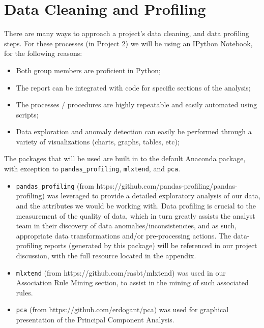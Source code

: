\documentclass[11pt]{article}
\providecommand{\tightlist}{%
      \setlength{\itemsep}{0pt}\setlength{\parskip}{0pt}}
\begin{document}
    \hypertarget{data-cleaning-and-profiling}{%
\section{Data Cleaning and
Profiling}\label{data-cleaning-and-profiling}}

There are many ways to approach a project's data cleaning, and data
profiling steps. For these processes (in Project 2) we will be using an
IPython Notebook, for the following reasons:

\begin{itemize}
\tightlist
\item
  Both group members are proficient in Python;
\item
  The report can be integrated with code for specific sections of the
  analysis;
\item
  The processes / procedures are highly repeatable and easily automated
  using scripts;
\item
  Data exploration and anomaly detection can easily be performed through
  a variety of visualizations (charts, graphs, tables, etc);
\end{itemize}

The packages that will be used are built in to the default Anaconda
package, with exception to \texttt{pandas\_profiling}, \texttt{mlxtend},
and \texttt{pca}.

\begin{itemize}
\item
  \texttt{pandas\_profiling} (from
  https://github.com/pandas-profiling/pandas-profiling) was leveraged to
  provide a detailed exploratory analysis of our data, and the
  attributes we would be working with. Data profiling is crucial to the
  measurement of the quality of data, which in turn greatly assists the
  analyst team in their discovery of data anomalies/inconsistencies, and
  as such, appropriate data transformations and/or pre-processing
  actions. The data-profiling reports (generated by this package) will
  be referenced in our project discussion, with the full resource
  located in the appendix.
\item
  \texttt{mlxtend} (from https://github.com/rasbt/mlxtend) was used in
  our Association Rule Mining section, to assist in the mining of such
  associated rules.
\item
  \texttt{pca} (from https://github.com/erdogant/pca) was used for
  graphical presentation of the Principal Component Analysis.
\end{itemize}
\end{document}
